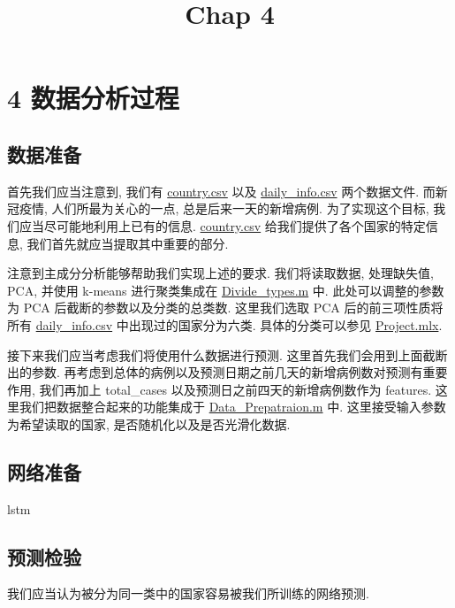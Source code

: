 \documentclass[UTF8]{ctexart}
\title{Chap 4}
\author{}
\date{}
\begin{document}
	\maketitle
    \section*{4 数据分析过程}
    \subsection*{数据准备}
    首先我们应当注意到, 我们有 \href{run:../data/COVID19/country.csv}{country.csv} 以及 \href{run:../data/COVID19/daily\_info.csv}{daily\_info.csv} 两个数据文件. 而新冠疫情, 人们所最为关心的一点, 总是后来一天的新增病例. 为了实现这个目标, 我们应当尽可能地利用上已有的信息. \href{run:../data/COVID19/country.csv}{country.csv} 给我们提供了各个国家的特定信息, 我们首先就应当提取其中重要的部分.

    注意到主成分分析能够帮助我们实现上述的要求. 我们将读取数据, 处理缺失值, PCA, 并使用 k-means 进行聚类集成在 \href{run:../src/Divide\_types.m}{Divide\_types.m} 中. 此处可以调整的参数为 PCA 后截断的参数以及分类的总类数. 这里我们选取 PCA 后的前三项性质将所有 \href{run:../data/COVID19/daily\_info.csv}{daily\_info.csv} 中出现过的国家分为六类. 具体的分类可以参见 \href{run:../Project.mlx}{Project.mlx}.

    接下来我们应当考虑我们将使用什么数据进行预测. 这里首先我们会用到上面截断出的参数. 再考虑到总体的病例以及预测日期之前几天的新增病例数对预测有重要作用, 我们再加上 total\_cases 以及预测日之前四天的新增病例数作为 features. 这里我们把数据整合起来的功能集成于 \href{run:../src/Data\_Prepatraion.m}{Data\_Prepatraion.m} 中. 这里接受输入参数为希望读取的国家, 是否随机化以及是否光滑化数据.

    \subsection*{网络准备}
    lstm
    
    \subsection*{预测检验}
    我们应当认为被分为同一类中的国家容易被我们所训练的网络预测.
\end{document}
